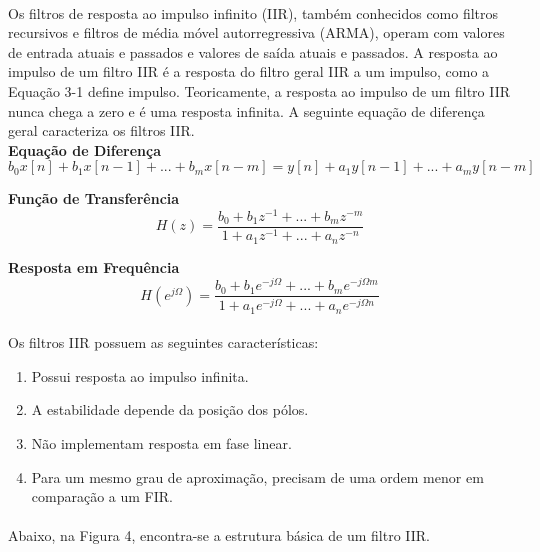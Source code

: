 \documentclass[12pt,fleqn]{article}
\begin{document}
\paragraph{} Os filtros de resposta ao impulso infinito (IIR), também conhecidos como filtros recursivos e filtros de média móvel autorregressiva (ARMA), operam com valores de entrada atuais e passados e valores de saída atuais e passados. A resposta ao impulso de um filtro IIR é a resposta do filtro geral IIR a um impulso, como a Equação 3-1 define impulso. Teoricamente, a resposta ao impulso de um filtro IIR nunca chega a zero e é uma resposta infinita. A seguinte equação de diferença geral caracteriza os filtros IIR.\\

\textbf{Equação de Diferença}
\begin{equation}
b_0x[n] + b_1x[n-1] + ... + b_mx[n-m] = y[n] + a_1y[n-1] + ... + a_my[n-m]
\end{equation}

\textbf{Função de Transferência}
\begin{equation}
H(z) = \frac{b_0 + b_1z^{-1} + ... + b_mz^{-m}}{1 + a_1z^{-1} + ... + a_nz^{-n}}
\end{equation}

\textbf{Resposta em Frequência}
\begin{equation}
H(e^{j\Omega}) = \frac{b_0 + b_1e^{-j\Omega} + ... + b_me^{-j\Omega m}}{1 + a_1e^{-j\Omega} + ... + a_ne^{-j\Omega n}}
\end{equation}

\paragraph{} Os filtros IIR possuem as seguintes características:
\begin{enumerate}
    \item Possui resposta ao impulso infinita. 
    \item A estabilidade depende da posição dos pólos.
    \item Não implementam resposta em fase linear.
    \item Para um mesmo grau de aproximação, precisam de uma ordem menor em comparação a um FIR.
    \\
\end{enumerate}

\paragraph{} Abaixo, na Figura 4, encontra-se a estrutura básica de um filtro IIR.
\end{document}
